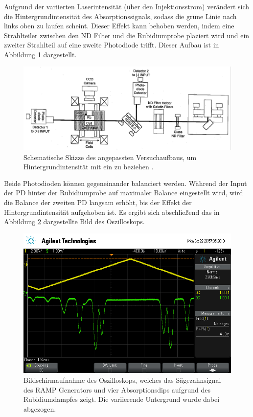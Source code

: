 Aufgrund der variierten Laserintensität (über den Injektionsstrom) verändert sich
die Hintergrundintensität des Absorptionssignals, sodass die grüne Linie nach
links oben zu laufen scheint. Dieser Effekt kann behoben werden, indem eine
Strahlteiler zwischen den ND Filter und die Rubidiumprobe plaziert wird und
ein zweiter Strahlteil auf eine zweite Photodiode trifft. Dieser Aufbau
ist in Abbildung \ref{fig:SetupImproved} dargestellt.

\begin{figure}
	\centering
	\includegraphics[width=\textwidth, angle=1, origin=c]{images/SetupImproved.pdf}
	\caption{Schematische Skizze des angepassten Versuchaufbaus,
	um Hintergrundintensität mit ein zu beziehen \cite{anleitung}.}
	\label{fig:SetupImproved}
\end{figure}

Beide Photodioden können gegeneinander balanciert werden.
Während der Input der PD hinter der
Rubidiumprobe auf maximaler Balance eingestellt wird, wird die
Balance der zweiten PD langsam erhöht, bis der Effekt der Hintergrundintensität
aufgehoben ist.
Es ergibt sich abschließend das in Abbildung \ref{fig:final-signal} dargestellte
Bild des Oszilloskops.

\begin{figure}
	\centering
	\includegraphics[width=.8\textwidth]{images/final-signal.png}
	\caption{Bildschirmaufnahme des Oszilloskops, welches das Sägezahnsignal des
	RAMP Generators und vier Absorptionsdips aufgrund des Rubidiumdampfes zeigt.
	Die variierende Untergrund wurde dabei abgezogen.}
	\label{fig:final-signal}
\end{figure}
